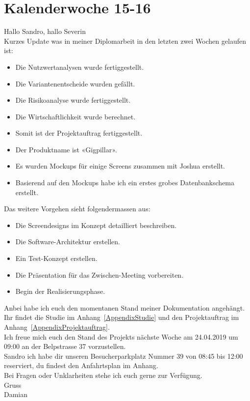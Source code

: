 \section{Kalenderwoche 15-16}

Hallo Sandro, hallo Severin\\

\noindent
Kurzes Update was in meiner Diplomarbeit in den letzten zwei Wochen
gelaufen ist:

\begin{itemize}
  \tightlist{}
  \item{}
    Die Nutzwertanalysen wurde fertiggestellt.
  \item{}
    Die Variantenentscheide wurden gefällt.
  \item{}
    Die Risikoanalyse wurde fertiggestellt.
  \item{}
    Die Wirtschaftlichkeit wurde berechnet.
  \item{}
    Somit ist der Projektauftrag fertiggestellt.
  \item{}
    Der Produktname ist «Gigpillar».
  \item{}
    Es wurden Mockups für einige Screens zusammen mit Joshua erstellt.
  \item{}
    Basierend auf den Mockups habe ich ein erstes grobes Datenbankschema
    erstellt.
\end{itemize}

\noindent
Das weitere Vorgehen sieht folgendermassen aus:

\begin{itemize}
  \tightlist{}
  \item{}
    Die Screendesigns im Konzept detailliert beschreiben.
  \item{}
    Die Software-Architektur erstellen.
  \item{}
    Ein Test-Konzept erstellen.
  \item{}
    Die Präsentation für das Zwischen-Meeting vorbereiten.
  \item{}
    Begin der Realisierungsphase.
\end{itemize}

\noindent
Anbei habe ich euch den momentanen Stand meiner Dokumentation angehängt.
Ihr findet die Studie im Anhang~\ref{AppendixStudie} und den Projektauftrag
im Anhang~\ref{AppendixProjektauftrag}.\\

\noindent
Ich freue mich euch den Stand des Projekts nächste Woche am
24.04.2019 um 09:00 an der Belpstrasse 37 vorzustellen.\\

\noindent
Sandro ich habe dir unseren Besucherparkplatz Nummer 39 von
08:45 bis 12:00 reserviert, du findest den Anfahrtsplan im
Anhang.\\

\noindent
Bei Fragen oder Unklarheiten stehe ich euch gerne zur Verfügung.\\

\noindent
Gruss\\
Damian
